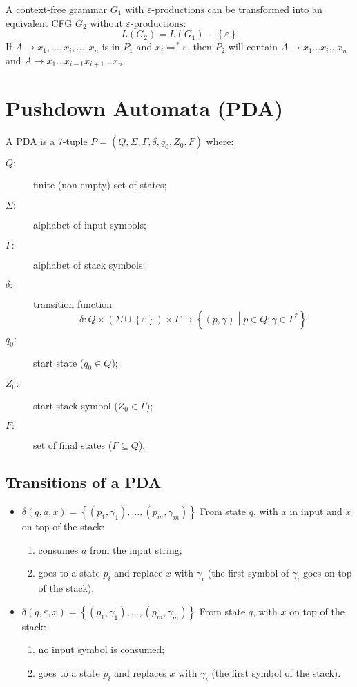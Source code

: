 A context-free grammar $G_1$ with $\varepsilon\text{-productions}$ can be transformed into an equivalent CFG $G_2$ without $\varepsilon\text{-productions}$:
$$
	L(G_2) = L(G_1) - \left\{\varepsilon\right\}
$$
If $A \to x_1, \ldots, x_i, \ldots, x_n$ is in $P_1$ and $x_i \Rightarrow^\ast \varepsilon$, then $P_2$ will contain $A \to x_1 \ldots x_i \ldots x_n$ and $A \to x_1 \ldots x_{i - 1} x_{i + 1} \ldots x_n$.

\section{Pushdown Automata (PDA)}
A PDA is a 7-tuple $P = (Q, \Sigma, \Gamma, \delta, q_0, Z_0, F)$ where:
\begin{description}
	\item[$Q:$] finite (non-empty) set of states;
	\item[$\Sigma:$] alphabet of input symbols;
	\item[$\Gamma:$] alphabet of stack symbols;
	\item[$\delta:$] transition function
	$$
		\delta: Q \times (\Sigma \cup \left\{\varepsilon\right\}) \times \Gamma \to \left\{(p, \gamma) \middle| p \in Q; \gamma \in \Gamma^\ast \right\}
	$$
	\item[$q_0:$] start state ($q_0 \in Q$);
	\item[$Z_0:$] start stack symbol ($Z_0 \in \Gamma$);
	\item[$F:$] set of final states ($F \subseteq Q$).
\end{description}

\subsection{Transitions of a PDA}
\begin{itemize}
	\item $\delta(q,a,x) = \left\{(p_1, \gamma_1), \ldots, (p_m, \gamma_m)\right\}$
	From state $q$, with $a$ in input and $x$ on top of the stack:
	\begin{enumerate}
		\item consumes $a$ from the input string;
		\item goes to a state $p_i$ and replace $x$ with $\gamma_i$ (the first symbol of $\gamma_i$ goes on top of the stack).
	\end{enumerate}
	\item $\delta(q,\varepsilon,x) = \left\{(p_1, \gamma_1), \ldots, (p_m, \gamma_m)\right\}$
	From state $q$, with $x$ on top of the stack:
	\begin{enumerate}
		\item no input symbol is consumed;
		\item goes to a state $p_i$ and replaces $x$ with $\gamma_i$ (the first symbol of the stack).
	\end{enumerate}
\end{itemize}

